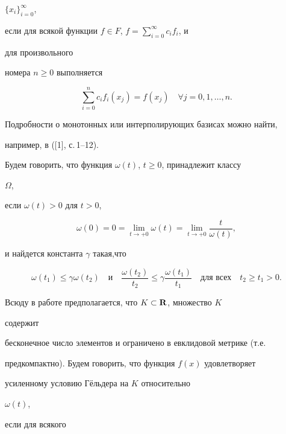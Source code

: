 $\{x_i\}^\infty_{i=0}$,


если для всякой функции $f\in F$, $f=\sum\limits^\infty_{i=0}c_if_i$, и


для произвольного


номера $n\ge 0$ выполняется


$$


\sum^n_{i=0}c_i f_i(x_j)=f(x_j)\quad


\forall j=0,1,\dotsc,n.


$$


Подробности о монотонных или интерполирующих базисах можно найти,


например, в ([1], с.\,1--12).





Будем говорить, что функция $\omega(t)$, $t\ge 0$, принадлежит классу


$\Omega$,


если $\omega(t)>0$ для $t>0$,


\begin{equation}


\omega(0)=0=\lim_{t\to +0}\omega(t)=


\lim_{t\to +0}\frac{t}{\omega(t)},


\end{equation}


и найдется константа $\gamma$ такая,что


\begin{equation}


\omega(t_1)\le\gamma\omega(t_2)\quad\text{и}\quad


\frac{\omega(t_2)}{t_2}\le\gamma\frac{\omega(t_1)}{t_1}\quad


\text{для всех}\quad t_2\ge t_1>0.


\end{equation}





Всюду в работе предполагается, что $K\subset\bold R$, множество $K$


содержит


бесконечное число элементов и ограничено в евклидовой метрике (т.е.


предкомпактно). Будем говорить, что функция $f(x)$ удовлетворяет


усиленному условию Г\"ельдера на $K$ относительно


$\omega(t)$,


если для всякого


